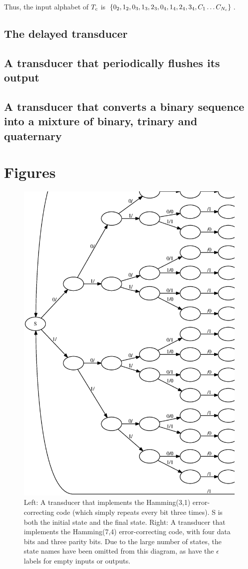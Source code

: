 \documentclass[english]{article}
\begin{document}
Thus, the input alphabet of $T_c$
is $\{ 0_2, 1_2,
       0_3, 1_3, 2_3,
       0_4, 1_4, 2_4, 3_4,
       C_{1} \ldots C_{N_c} \}$.

\subsection*{The delayed transducer}

\subsection*{A transducer that periodically flushes its output}

\subsection*{A transducer that converts a binary sequence into a mixture of binary, trinary and quaternary}


\newpage
\section*{Figures}

\newpage
\begin{figure}
\includegraphics[width=.5\textwidth]{hamming74.ps}
\caption{ 
Left:
A transducer that implements the Hamming(3,1) error-correcting code
(which simply repeats every bit three times).
S is both the initial state and the final state.
Right:
A transducer that implements the Hamming(7,4) error-correcting code,
with four data bits and three parity bits.
Due to the large number of states, the state names have been omitted from this diagram,
as have the $\epsilon$ labels for empty inputs or outputs.
}
\end{figure}
\end{document}
